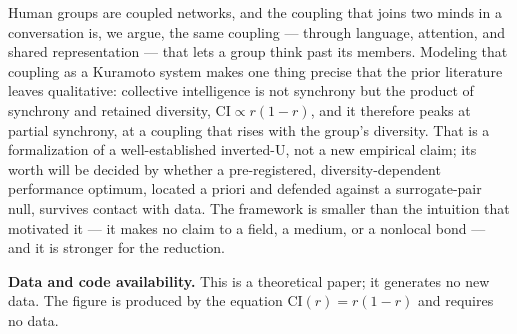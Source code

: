 \documentclass[11pt]{article}
\begin{document}
Human groups are coupled networks, and the coupling that joins two minds in a conversation is, we argue, the same coupling --- through language, attention, and shared representation --- that lets a group think past its members. Modeling that coupling as a Kuramoto system makes one thing precise that the prior literature leaves qualitative: collective intelligence is not synchrony but the product of synchrony and retained diversity, $\mathrm{CI} \propto r(1-r)$, and it therefore peaks at partial synchrony, at a coupling that rises with the group's diversity. That is a formalization of a well-established inverted-U, not a new empirical claim; its worth will be decided by whether a pre-registered, diversity-dependent performance optimum, located a priori and defended against a surrogate-pair null, survives contact with data. The framework is smaller than the intuition that motivated it --- it makes no claim to a field, a medium, or a nonlocal bond --- and it is stronger for the reduction.

\bigskip

\noindent\textbf{Data and code availability.} This is a theoretical paper; it generates no new data. The figure is produced by the equation $\mathrm{CI}(r)=r(1-r)$ and requires no data.

\bigskip


\end{document}
